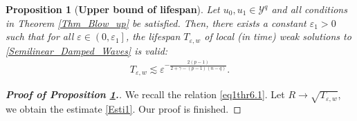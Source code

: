 \documentclass[11pt,reqno]{amsart}
\newtheorem{proposition}{Proposition}[section]
\begin{document}
\begin{proposition}[\textbf{Upper bound of lifespan}]\label{upperbound}
Let $u_0,u_1\in \mathcal{Y}^q$ and all conditions in Theorem \ref{Thm_Blow_up} be satisfied. Then, there exists a constant $\varepsilon_1>0$ such that for all $\varepsilon \in\left(0, \varepsilon_1\right]$, the lifespan $T_{\varepsilon, w}$ of local (in time) weak solutions to \eqref{Semilinear_Damped_Waves} is valid:
\begin{align}
T_{\varepsilon, w}\lesssim \varepsilon^{-\frac{2(p-1)}{2+\gamma-(p-1)(n-q)}}. \label{Esti1}
\end{align}
\end{proposition}
\begin{proof}[\textbf{Proof of Proposition \ref{upperbound}.}]
We recall the relation \eqref{eq1thr6.1}. 
Let $R\to \sqrt{T_{\varepsilon, w}}$, we obtain the estimate \eqref{Esti1}. Our proof is finished.
\end{proof}
\end{document}
